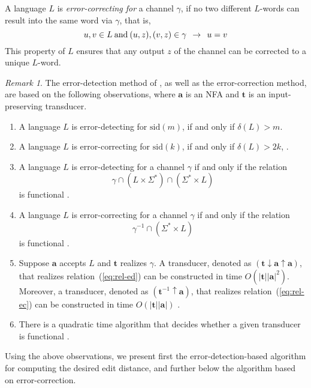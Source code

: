 \documentclass{article}
\theoremstyle{plain}
\theoremstyle{definition}
\theoremstyle{remark}
\newtheorem{remark}[theorem]{Remark}
\newcommand{\e}{\lambda}
\newcommand\dsid{\ensuremath{\delta}\xspace}
\newcommand\al{\Sigma}        \newcommand\alG{\Gamma}        \newcommand\eew{(\e/\e)}        \newcommand\ealph{E_\al}   \newcommand\aut{\mathbf{a}}   \newcommand\autb{\mathbf{b}}   \newcommand\tr{\mathbf{t}}    \newcommand\sz[1]{|#1|}       \newcommand\weight[1]{\mathrm{weight}(#1)}       \newcommand\ch{\gamma}        \newcommand\chid{\mathrm{id}} \newcommand\chsid{\mathrm{sid}} \newcommand\dist{\dsid}               \newcommand\inp{\mathrm{inp}}
\begin{document}
A language $L$ is \emph{error-correcting for} a channel $\ch$, if no two different $L$-words can result into the same word via $\ch$, that is,
\[
u,v\in L\>\hbox{and}\> (u,z),(v,z)\in\ch\>\>\rightarrow\>\> u=v
\]
This property of $L$ ensures that any output $z$ of the
channel can be corrected to a unique $L$-word.


\begin{remark}\label{rem:ed}
The error-detection method of \cite{KonSil:2010}, as well as the error-correction method, are based on the
following observations, where $\aut$ is an NFA
and $\tr$ is an input-preserving transducer.
\begin{enumerate}
  \item
   A language $L$ is error-detecting for $\chsid(m)$,
   if and only if
   $\dist(L)>m$.
  \item
   A language $L$ is error-correcting for $\chsid(k)$,
   if and only if
   $\dist(L)>2k$,  \cite{Levenshtein:66:en}.
  \item
  A language $L$ is error-detecting for a channel
  $\ch$ if and only if the relation
  \begin{equation}\label{eq:rel-ed}
    \ch\cap(L\times \al^*)\cap(\al^*\times L)
  \end{equation}
  is functional \cite{Kon:2002}.
  \item
  A language $L$ is error-correcting for a channel
  $\ch$ if and only if the relation
  \begin{equation}\label{eq:rel-ec}
      \ch^{-1}\cap(\al^*\times L)
  \end{equation}
  is functional \cite{Kon:2002}.
  \item
  Suppose $\aut$ accepts $L$ and $\tr$ realizes $\ch$.
  A transducer, denoted as $(\tr\downarrow\aut\uparrow\aut)$,
  that realizes relation~(\ref{eq:rel-ed}) can be constructed
  in time $O(\sz{\tr}\sz{\aut}^2)$.
  Moreover, a transducer, denoted as $(\tr^{-1}\uparrow\aut)$,
  that realizes relation~(\ref{eq:rel-ec}) can be constructed
  in time $O(\sz{\tr}\sz{\aut})$ \cite{Kon:2002}.
  \item
  There is a quadratic time algorithm that decides whether a given transducer is functional \cite{AllMoh:2003,BeCaPrSa2003}.
\end{enumerate}
\end{remark}
Using the above observations, we present first
the error-detection-based algorithm for computing
the desired edit distance, and further below the algorithm based on error-correction.
\end{document}
